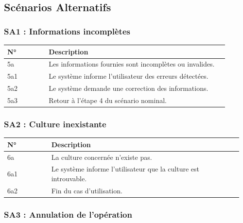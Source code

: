 \hypertarget{scuxe9narios-alternatifs-1}{%
\subsection{Scénarios Alternatifs}\label{scuxe9narios-alternatifs-1}}

\hypertarget{sa1-informations-incompluxe8tes}{%
\subsubsection{SA1 : Informations
incomplètes}\label{sa1-informations-incompluxe8tes}}

\begin{longtable}{@{}p{0.18\linewidth}p{0.78\linewidth}@{}}
\toprule
\rowcolors{2}{gray!10}{white}
\textbf{N°} & \textbf{Description} \\
\midrule
\endhead
5a & Les informations fournies sont incomplètes ou invalides. \\
5a1 & Le système informe l'utilisateur des erreurs détectées. \\
5a2 & Le système demande une correction des informations. \\
5a3 & Retour à l'étape 4 du scénario nominal. \\
\bottomrule
\end{longtable}

\hypertarget{sa2-culture-inexistante}{%
\subsubsection{SA2 : Culture
inexistante}\label{sa2-culture-inexistante}}

\begin{longtable}{@{}p{0.18\linewidth}p{0.78\linewidth}@{}}
\toprule
\rowcolors{2}{gray!10}{white}
\textbf{N°} & \textbf{Description} \\
\midrule
\endhead
6a & La culture concernée n'existe pas. \\
6a1 & Le système informe l'utilisateur que la culture est
introuvable. \\
6a2 & Fin du cas d'utilisation. \\
\bottomrule
\end{longtable}

\hypertarget{sa3-annulation-de-lopuxe9ration}{%
\subsubsection{SA3 : Annulation de
l'opération}\label{sa3-annulation-de-lopuxe9ration}}

